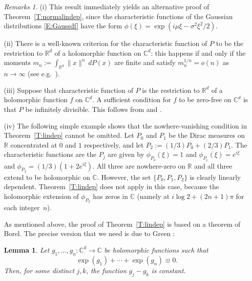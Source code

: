 \documentclass[11pt]{amsart}
\theoremstyle{plain}
\newtheorem{lemma}[theorem]{Lemma}
\theoremstyle{remark}
\newtheorem*{remarks}{Remarks}
\newcommand{\CC}{\mathbb{C}}
\newcommand{\RR}{\mathbb{R}}
\begin{document}
\begin{remarks}
(i) This result immediately yields  an alternative proof of Theorem~\ref{T:normalindep},
since the characteristic functions of the Gaussian distributions
\eqref{E:Gaussdf} have the form $\phi(\xi)=\exp(i\mu \xi-\sigma^2 \xi^2/2)$.
			
(ii) There is a well-known criterion for the characteristic function of $P$  to be the restriction to $\RR^d$
of a holomorphic function on $\CC^d$: this happens if and only if the moments $m_n:=\int_{\RR^d}\|x\|^n\, dP(x)$
are finite and satisfy  $m_n^{1/n}=o(n)$ as $n\to\infty$ (see e.g.\ \cite[Theorem~4.2.2]{LR79}).
			
(iii) Suppose that characteristic function of $P$ is the restriction to $\RR^d$
of a holomorphic function $f$ on $\CC^d$. A sufficient condition for $f$ to be zero-free on $\CC^d$ is that $P$
be infinitely divisible. This follows from \cite[Theorem~3.1]{HS78} and \cite[Theorem~4]{LS52}.
			
(iv) The following simple example shows that 
the nowhere-vanishing condition in Theorem~\ref{T:lindep} cannot be omitted.
Let $P_0$ and $P_1$ be the Dirac measures on $\RR$ concentrated at $0$ and $1$ respectively, 
and let $P_2:=(1/3)P_0+(2/3)P_1$. 
The characteristic functions are the $P_j$ are given by 
$\phi_{P_0}(\xi)=1$ and $\phi_{P_1}(\xi)=e^{i\xi}$ and $\phi_{P_2}=(1/3)(1+2e^{i\xi})$.
All three are nowhere-zero on $\RR$ and
all three extend to be holomorphic on $\CC$.
However,  the set $\{P_0,P_1,P_2\}$ is clearly linearly dependent. 
Theorem~\ref{T:lindep} does not apply in this case, because the holomorphic extension of $\phi_{P_2}$
has zeros in $\CC$ (namely at $i\log2 +(2n+1)\pi$ for each integer~$n$).
\end{remarks}
		
As mentioned above, the proof of Theorem~\ref{T:lindep} is based on a theorem of Borel. 
The precise version that we need is due to Green \cite[p.98]{Gr72}:
		
\begin{lemma}\label{L:lindep}
Let $g_1,\dots,g_n:\CC^d\to\CC$ be holomorphic functions such that
\[
\exp(g_1)+\cdots+\exp(g_n)\equiv0.
\]
Then, for some distinct $j,k$, the function $g_j-g_k$ is constant.
\end{lemma}
		
\end{document}
